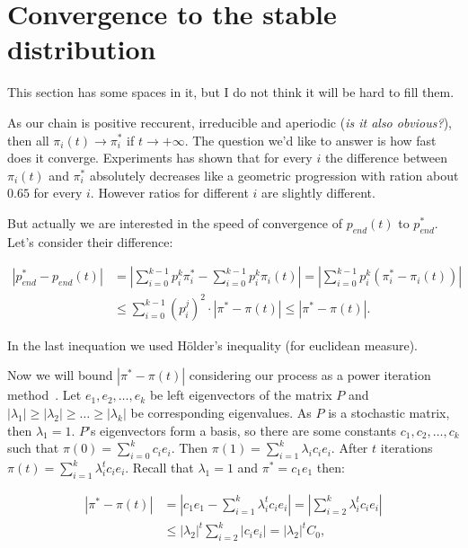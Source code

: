 \documentclass{article}
\begin{document}
\section{Convergence to the stable distribution}

This section has some spaces in it, but I do not think it will be hard to fill them.

As our chain is positive reccurent, irreducible and aperiodic (\textit{is it also obvious?}), then all $\pi_i(t) \to \pi^*_i$ if $t \to +\infty.$ The question we'd like to answer is how fast does it converge. Experiments has shown that for every $i$ the difference between $\pi_i(t)$ and $\pi^*_i$ absolutely decreases like a geometric progression with ration about $0.65$ for every $i.$ However ratios for different $i$ are slightly different.

But actually we are interested in the speed of convergence of $p_{end}(t)$ to $p_{end}^*$. Let's consider their difference:

\begin{align*}
  |p_{end}^* - p_{end}(t)| &= |\sum\limits_{i = 0}^{k - 1} p_i^k \pi^*_i - \sum\limits_{i = 0}^{k - 1} p_i^k \pi_i(t)| = |\sum\limits_{i = 0}^{k - 1} p_i^k (\pi^*_i - \pi_i(t))| \\
  &\le \sum\limits_{i = 0}^{k - 1} (p_i^j)^2 \cdot |\pi^* - \pi(t)| \le |\pi^* - \pi(t)|.
\end{align*}

In the last inequation we used Hölder's inequality (for euclidean measure).

Now we will bound $|\pi^* - \pi(t)|$ considering our process as a power iteration method~\cite{pow-it}. Let $e_1, e_2, \dots, e_k$ be left eigenvectors of the matrix $P$ and $|\lambda_1| \ge |\lambda_2| \ge \dots \ge |\lambda_k|$ be corresponding eigenvalues. As $P$ is a stochastic matrix, then $\lambda_1 = 1.$ $P$'s eigenvectors form a basis, so there are some constants $c_1, c_2, \dots, c_k$ such that $\pi(0) = \sum\limits_{i = 0}^k c_i e_i.$
Then $\pi(1) = \sum\limits_{i = 1}^k \lambda_i c_i e_i.$ After $t$ iterations $\pi(t) = \sum\limits_{i = 1}^k \lambda_i^t c_i e_i.$ Recall that $\lambda_1 = 1$ and $\pi^* = c_1 e_1$ then:

\begin{align*}
  |\pi^* - \pi(t)| &= |c_1 e_1 - \sum\limits_{i = 1}^k \lambda_i^t c_i e_i| = |\sum\limits_{i = 2}^k \lambda_i^t c_i e_i | \\
  &\le |\lambda_2|^t \sum\limits_{i = 2}^k |c_i e_i| = |\lambda_2|^t C_0,
\end{align*}
\end{document}
